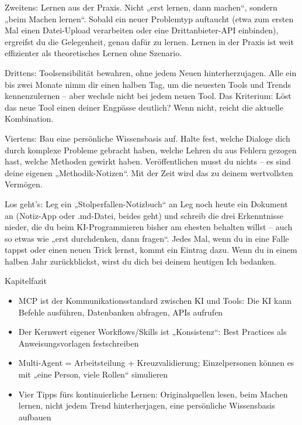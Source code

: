 Zweitens: Lernen aus der Praxis. Nicht „erst lernen, dann machen“, sondern „beim Machen lernen“. Sobald ein neuer Problemtyp auftaucht (etwa zum ersten Mal einen Datei-Upload verarbeiten oder eine Drittanbieter-API einbinden), ergreifst du die Gelegenheit, genau dafür zu lernen. Lernen in der Praxis ist weit effizienter als theoretisches Lernen ohne Szenario.

Drittens: Toolsensibilität bewahren, ohne jedem Neuen hinterherzujagen. Alle ein bis zwei Monate nimm dir einen halben Tag, um die neuesten Tools und Trends kennenzulernen – aber wechsle nicht bei jedem neuen Tool. Das Kriterium: Löst das neue Tool einen deiner Engpässe deutlich? Wenn nicht, reicht die aktuelle Kombination.

Viertens: Bau eine persönliche Wissensbasis auf. Halte fest, welche Dialoge dich durch komplexe Probleme gebracht haben, welche Lehren du aus Fehlern gezogen hast, welche Methoden gewirkt haben. Veröffentlichen musst du nichts – es sind deine eigenen „Methodik-Notizen“. Mit der Zeit wird das zu deinem wertvollsten Vermögen.

\begin{tcbpractice}{Los geht's: Leg ein „Stolperfallen-Notizbuch“ an}
Leg noch heute ein Dokument an (Notiz-App oder .md-Datei, beides geht) und schreib die drei Erkenntnisse nieder, die du beim KI-Programmieren bisher am ehesten behalten willst – auch so etwas wie „erst durchdenken, dann fragen“. Jedes Mal, wenn du in eine Falle tappst oder einen neuen Trick lernst, kommt ein Eintrag dazu. Wenn du in einem halben Jahr zurückblickst, wirst du dich bei deinem heutigen Ich bedanken.

\end{tcbpractice}

\begin{tcbsummary}{Kapitelfazit}
\begin{itemize}
  \item MCP ist der Kommunikationsstandard zwischen KI und Tools: Die KI kann Befehle ausführen, Datenbanken abfragen, APIs aufrufen
  \item Der Kernwert eigener Workflows/Skills ist „Konsistenz“: Best Practices als Anweisungsvorlagen festschreiben
  \item Multi-Agent = Arbeitsteilung + Kreuzvalidierung; Einzelpersonen können es mit „eine Person, viele Rollen“ simulieren
  \item Vier Tipps fürs kontinuierliche Lernen: Originalquellen lesen, beim Machen lernen, nicht jedem Trend hinterherjagen, eine persönliche Wissensbasis aufbauen
\end{itemize}

\end{tcbsummary}
